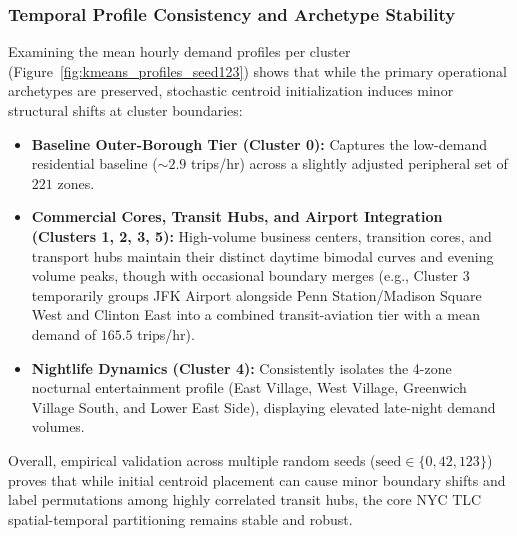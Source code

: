 \documentclass[11pt,a4paper]{article}
\begin{document}
\subsubsection{Temporal Profile Consistency and Archetype Stability}
Examining the mean hourly demand profiles per cluster (Figure~\ref{fig:kmeans_profiles_seed123}) shows that while the primary operational archetypes are preserved, stochastic centroid initialization induces minor structural shifts at cluster boundaries:
\begin{itemize}
    \item \textbf{Baseline Outer-Borough Tier (Cluster 0):} Captures the low-demand residential baseline ($\sim 2.9$ trips/hr) across a slightly adjusted peripheral set of $221$ zones.
    \item \textbf{Commercial Cores, Transit Hubs, and Airport Integration (Clusters 1, 2, 3, 5):} High-volume business centers, transition cores, and transport hubs maintain their distinct daytime bimodal curves and evening volume peaks, though with occasional boundary merges (e.g., Cluster 3 temporarily groups JFK Airport alongside Penn Station/Madison Square West and Clinton East into a combined transit-aviation tier with a mean demand of $165.5$ trips/hr).
    \item \textbf{Nightlife Dynamics (Cluster 4):} Consistently isolates the 4-zone nocturnal entertainment profile (East Village, West Village, Greenwich Village South, and Lower East Side), displaying elevated late-night demand volumes.
\end{itemize}

Overall, empirical validation across multiple random seeds ($\text{seed} \in \{0, 42, 123\}$) proves that while initial centroid placement can cause minor boundary shifts and label permutations among highly correlated transit hubs, the core NYC TLC spatial-temporal partitioning remains stable and robust.
\end{document}
